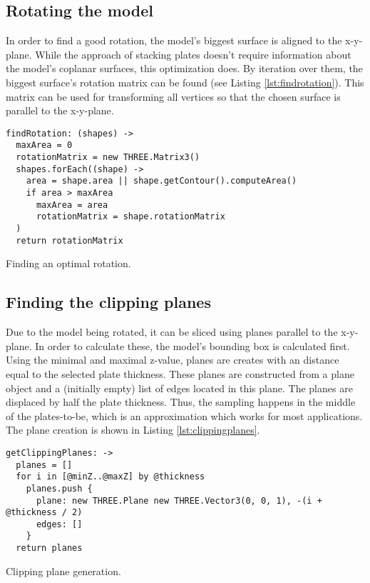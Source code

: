 \documentclass[../ClassicThesis.tex]{subfiles}
\begin{document}
\subsection{Rotating the model}

In order to find a good rotation, the model's biggest surface is aligned to the x-y-plane. While the approach of stacking plates doesn't require information about the model's coplanar surfaces, this optimization does. By iteration over them, the biggest surface's rotation matrix can be found (see Listing \ref{lst:findrotation}). This matrix can be used for transforming all vertices so that the chosen surface is parallel to the x-y-plane.

\begin{listing}[ht]
\begin{verbatim}
findRotation: (shapes) ->
  maxArea = 0
  rotationMatrix = new THREE.Matrix3()
  shapes.forEach((shape) ->
    area = shape.area || shape.getContour().computeArea()
    if area > maxArea
      maxArea = area
      rotationMatrix = shape.rotationMatrix
  )
  return rotationMatrix
\end{verbatim}
\caption{Finding an optimal rotation.}
\label{lst:findrotation}
\end{listing}

\subsection{Finding the clipping planes}

Due to the model being rotated, it can be sliced using planes parallel to the x-y-plane. In order to calculate these, the model's bounding box is calculated first. Using the minimal and maximal z-value, planes are creates with an distance equal to the selected plate thickness. These planes are constructed from a \threejs plane object and a (initially empty) list of edges located in this plane. The planes are displaced by half the plate thickness. Thus, the sampling happens in the middle of the plates-to-be, which is an approximation which works for most applications. The plane creation is shown in Listing \ref{lst:clippingplanes}.

\begin{listing}[ht]
\begin{verbatim}
getClippingPlanes: ->
  planes = []
  for i in [@minZ..@maxZ] by @thickness
    planes.push {
      plane: new THREE.Plane new THREE.Vector3(0, 0, 1), -(i + @thickness / 2)
      edges: []
    }
  return planes
\end{verbatim}
\caption{Clipping plane generation.}
\label{lst:clippingplanes}
\end{listing}
\end{document}
